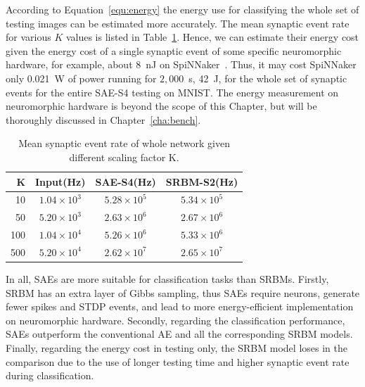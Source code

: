 According to Equation~\ref{equ:energy} the energy use for classifying the whole set of testing images can be estimated more accurately.
The mean synaptic event rate for various $K$ values is listed in Table~\ref{tbl:fire_rate}.
Hence, we can estimate their energy cost given the energy cost of a single synaptic event of some specific neuromorphic hardware, for example, about 8~nJ on SpiNNaker~\DIFdelbegin {}\DIFdelend \DIFaddbegin {}\DIFaddend .
Thus, it may cost SpiNNaker only 0.021~W of power running for $2,000$~s, 42~J, for the whole set of synaptic events for the entire SAE-S4 testing on MNIST.
The energy measurement on neuromorphic hardware is beyond the scope of this Chapter, but will be thoroughly discussed in Chapter~\ref{cha:bench}.
\begin{table}[htbp]
	\centering
	\caption{\label{tbl:fire_rate}Mean synaptic event rate of whole network given different scaling factor K.}
	\bgroup
	\def\arraystretch{1.4}
	\begin{tabular}{r c c c}
		K & Input(Hz) & SAE-S4(Hz) & SRBM-S2(Hz)\\
		\hline
		10 & $1.04 \times 10^3$ & $5.28 \times 10^5$ & $5.34 \times 10^5$ \\
		50 & $5.20 \times 10^3$ & $2.63 \times 10^6$ & $2.67 \times 10^6$ \\
		100 & $1.04 \times 10^4$ & $5.26 \times 10^6$ & $5.33 \times 10^6$ \\
		500 & $5.20 \times 10^4$ & $2.62 \times 10^7$ & $2.65 \times 10^7$ \\
	\end{tabular}
	\egroup
\end{table}

In all, SAEs are more suitable for classification tasks than SRBMs.
Firstly, \DIFaddbegin {}\DIFaddend SRBM has an extra layer of Gibbs sampling, thus SAEs require \DIFdelbegin {}\DIFdelend \DIFaddbegin {}\DIFaddend neurons, generate fewer spikes and STDP events, and lead to \DIFaddbegin {}\DIFaddend more energy-efficient implementation on neuromorphic hardware.
Secondly, regarding the classification performance, SAEs outperform the conventional AE and all the corresponding SRBM models.
Finally, regarding the energy cost in testing only, the SRBM model loses in the comparison due to the use of longer testing time and higher synaptic event rate during classification.

